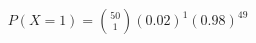 \documentclass[preview]{standalone}
\begin{document}
\begin{align*}
P(X=1) = \binom{50}{1} (0.02)^1 (0.98)^{49}
\end{align*}
\end{document}
